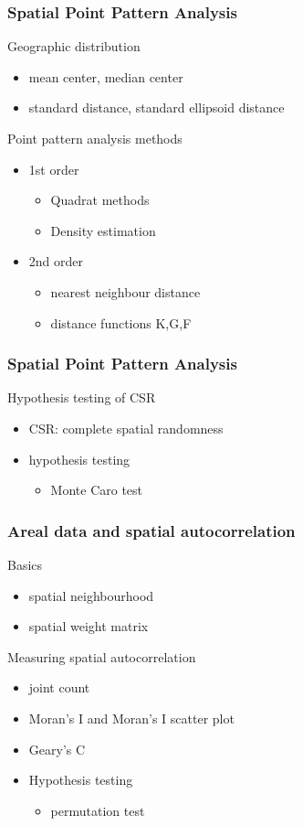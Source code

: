 \documentclass[10pt]{beamer}
\newcommand{\bitemize}{\begin{itemize}}
\newcommand{\eitemize}{\end{itemize}}
\newcommand{\bblock}{\begin{block}}
\newcommand{\eblock}{\end{block}}
\begin{document}
\begin{frame}

\frametitle{Spatial Point Pattern Analysis}
\bblock{Geographic distribution}
\bitemize
\item mean center, median center 
\item standard distance, standard ellipsoid distance 
\eitemize
\eblock

\bblock{Point pattern analysis methods}
\bitemize
\item 1st order  
\bitemize
\item Quadrat methods
\item Density estimation
\eitemize
\item 2nd order
\bitemize
\item nearest neighbour distance 
\item distance functions K,G,F 
\eitemize
\eitemize
\eblock

\end{frame}


\begin{frame}

\frametitle{Spatial Point Pattern Analysis}

\bblock{Hypothesis testing of CSR}
\bitemize
\item CSR: complete spatial randomness
\item hypothesis testing
\bitemize
\item Monte Caro test
\eitemize
\eitemize
\eblock
\end{frame}

\begin{frame}

\frametitle{Areal data and spatial autocorrelation}

\bblock{Basics}
\bitemize
\item spatial neighbourhood
\item spatial weight matrix
\eitemize
\eblock

\bblock{Measuring spatial autocorrelation}
\bitemize
\item joint count 
\item Moran's I and Moran's I scatter plot 
\item Geary's C
\item Hypothesis testing
\bitemize
\item permutation test
\eitemize
\eitemize
\eblock

\end{frame}
\end{document}
